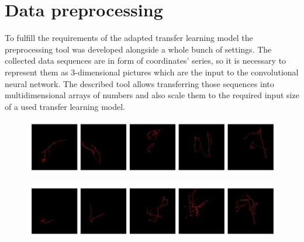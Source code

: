\section{Data preprocessing}\label{sec:data-preprocessing}
To fulfill the requirements of the adapted transfer learning model the preprocessing tool was developed alongside a whole bunch of settings.
The collected data sequences are in form of coordinates' series, so it is necessary to represent them as 3-dimensional pictures which are the input to the convolutional neural network.
The described tool allows transferring those sequences into multidimensional arrays of numbers and also scale them to the required input size of a used transfer learning model.

\begin{figure}[!hbt]
    \center
    \includegraphics[width=\linewidth]{resources/bot_sequences}
    \label{fig:bot_sequences}
\end{figure}
\begin{figure}[!hbt]
    \center
    \includegraphics[width=\linewidth]{resources/user_sequences}
    \label{fig:user_sequences}
\end{figure}


